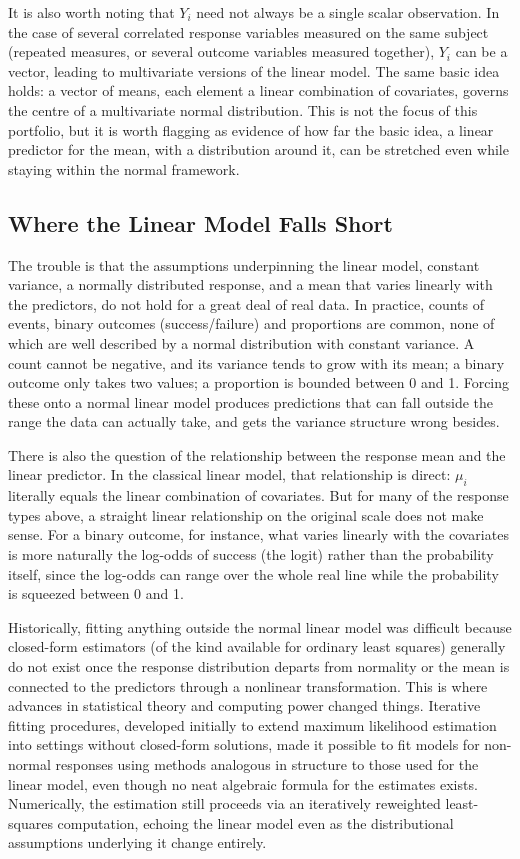 \documentclass[12pt,a4paper]{report}
\begin{document}
It is also worth noting that $Y_i$ need not always be a single scalar observation. In the case of several correlated response variables measured on the same subject (repeated measures, or several outcome variables measured together), $Y_i$ can be a vector, leading to multivariate versions of the linear model. The same basic idea holds: a vector of means, each element a linear combination of covariates, governs the centre of a multivariate normal distribution. This is not the focus of this portfolio, but it is worth flagging as evidence of how far the basic idea, a linear predictor for the mean, with a distribution around it, can be stretched even while staying within the normal framework.

\subsection*{Where the Linear Model Falls Short}

The trouble is that the assumptions underpinning the linear model, constant variance, a normally distributed response, and a mean that varies linearly with the predictors, do not hold for a great deal of real data. In practice, counts of events, binary outcomes (success/failure) and proportions are common, none of which are well described by a normal distribution with constant variance. A count cannot be negative, and its variance tends to grow with its mean; a binary outcome only takes two values; a proportion is bounded between 0 and 1. Forcing these onto a normal linear model produces predictions that can fall outside the range the data can actually take, and gets the variance structure wrong besides.

There is also the question of the relationship between the response mean and the linear predictor. In the classical linear model, that relationship is direct: $\mu_i$ literally equals the linear combination of covariates. But for many of the response types above, a straight linear relationship on the original scale does not make sense. For a binary outcome, for instance, what varies linearly with the covariates is more naturally the log-odds of success (the logit) rather than the probability itself, since the log-odds can range over the whole real line while the probability is squeezed between 0 and 1.

Historically, fitting anything outside the normal linear model was difficult because closed-form estimators (of the kind available for ordinary least squares) generally do not exist once the response distribution departs from normality or the mean is connected to the predictors through a nonlinear transformation. This is where advances in statistical theory and computing power changed things. Iterative fitting procedures, developed initially to extend maximum likelihood estimation into settings without closed-form solutions, made it possible to fit models for non-normal responses using methods analogous in structure to those used for the linear model, even though no neat algebraic formula for the estimates exists. Numerically, the estimation still proceeds via an iteratively reweighted least-squares computation, echoing the linear model even as the distributional assumptions underlying it change entirely.
\end{document}
